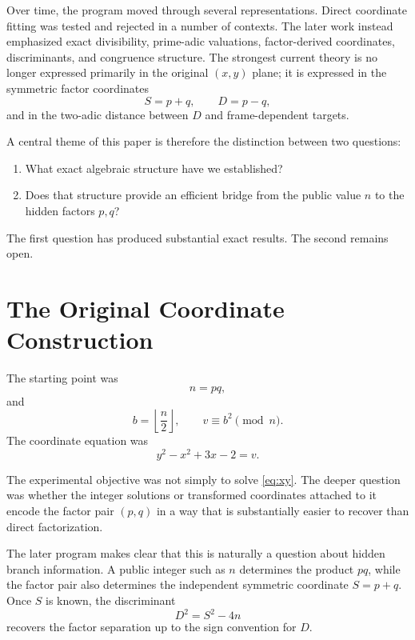 \documentclass[11pt,a4paper]{article}
\begin{document}
Over time, the program moved through several representations.  Direct coordinate fitting was tested and rejected in a number of contexts.  The later work instead emphasized exact divisibility, prime-adic valuations, factor-derived coordinates, discriminants, and congruence structure.  The strongest current theory is no longer expressed primarily in the original $(x,y)$ plane; it is expressed in the symmetric factor coordinates
\[
 S=p+q,
 \qquad
 D=p-q,
\]
and in the two-adic distance between $D$ and frame-dependent targets.

A central theme of this paper is therefore the distinction between two questions:
\begin{enumerate}[leftmargin=1.7em]
    \item What exact algebraic structure have we established?
    \item Does that structure provide an efficient bridge from the public value $n$ to the hidden factors $p,q$?
\end{enumerate}
The first question has produced substantial exact results.  The second remains open.

\section{The Original Coordinate Construction}

The starting point was
\begin{equation}
 n=pq,
 \label{eq:semiprime}
\end{equation}
and
\begin{equation}
 b=\left\lfloor\frac n2\right\rfloor,
 \qquad
 v\equiv b^2\pmod n.
 \label{eq:vdef}
\end{equation}
The coordinate equation was
\begin{equation}
 y^2-x^2+3x-2=v.
 \label{eq:xy}
\end{equation}

The experimental objective was not simply to solve \eqref{eq:xy}.  The deeper question was whether the integer solutions or transformed coordinates attached to it encode the factor pair $(p,q)$ in a way that is substantially easier to recover than direct factorization.

The later program makes clear that this is naturally a question about hidden branch information.  A public integer such as $n$ determines the product $pq$, while the factor pair also determines the independent symmetric coordinate $S=p+q$.  Once $S$ is known, the discriminant
\begin{equation}
 D^2=S^2-4n
 \label{eq:disc}
\end{equation}
recovers the factor separation up to the sign convention for $D$.
\end{document}
